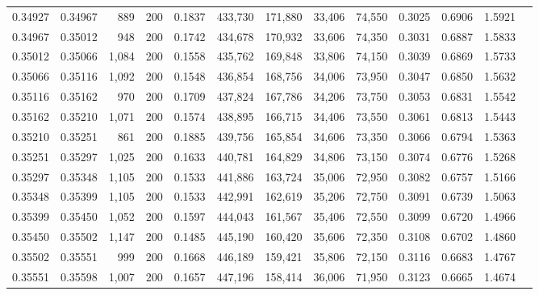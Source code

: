 \begin{tabular}{rrrrrrrrrrrrr}
0.34927 & 0.34967 &    889 & 200 &                                     0.1837 & 433,730 & 171,880 &  33,406 &  74,550 & 0.3025 & 0.6906 & 1.5921 \\
0.34967 & 0.35012 &    948 & 200 &                                     0.1742 & 434,678 & 170,932 &  33,606 &  74,350 & 0.3031 & 0.6887 & 1.5833 \\
0.35012 & 0.35066 &  1,084 & 200 &                                     0.1558 & 435,762 & 169,848 &  33,806 &  74,150 & 0.3039 & 0.6869 & 1.5733 \\
0.35066 & 0.35116 &  1,092 & 200 &                                     0.1548 & 436,854 & 168,756 &  34,006 &  73,950 & 0.3047 & 0.6850 & 1.5632 \\
0.35116 & 0.35162 &    970 & 200 &                                     0.1709 & 437,824 & 167,786 &  34,206 &  73,750 & 0.3053 & 0.6831 & 1.5542 \\
0.35162 & 0.35210 &  1,071 & 200 &                                     0.1574 & 438,895 & 166,715 &  34,406 &  73,550 & 0.3061 & 0.6813 & 1.5443 \\
0.35210 & 0.35251 &    861 & 200 &                                     0.1885 & 439,756 & 165,854 &  34,606 &  73,350 & 0.3066 & 0.6794 & 1.5363 \\
0.35251 & 0.35297 &  1,025 & 200 &                                     0.1633 & 440,781 & 164,829 &  34,806 &  73,150 & 0.3074 & 0.6776 & 1.5268 \\
0.35297 & 0.35348 &  1,105 & 200 &                                     0.1533 & 441,886 & 163,724 &  35,006 &  72,950 & 0.3082 & 0.6757 & 1.5166 \\
0.35348 & 0.35399 &  1,105 & 200 &                                     0.1533 & 442,991 & 162,619 &  35,206 &  72,750 & 0.3091 & 0.6739 & 1.5063 \\
0.35399 & 0.35450 &  1,052 & 200 &                                     0.1597 & 444,043 & 161,567 &  35,406 &  72,550 & 0.3099 & 0.6720 & 1.4966 \\
0.35450 & 0.35502 &  1,147 & 200 &                                     0.1485 & 445,190 & 160,420 &  35,606 &  72,350 & 0.3108 & 0.6702 & 1.4860 \\
0.35502 & 0.35551 &    999 & 200 &                                     0.1668 & 446,189 & 159,421 &  35,806 &  72,150 & 0.3116 & 0.6683 & 1.4767 \\
0.35551 & 0.35598 &  1,007 & 200 &                                     0.1657 & 447,196 & 158,414 &  36,006 &  71,950 & 0.3123 & 0.6665 & 1.4674 \\

\end{tabular}
